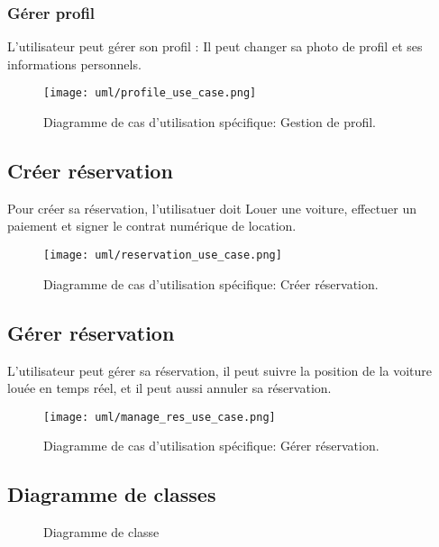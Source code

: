 \subsubsection{Gérer profil}
L'utilisateur peut gérer son profil : Il peut changer sa photo de profil et ses informations personnels.\\
\begin{figure}[H]
    \centering
    \texttt{[image: uml/profile\_use\_case.png]}
    \vspace{1cm}
    \captionsetup{justification=centering}
    \caption{Diagramme de cas d'utilisation spécifique: Gestion de profil.}
    \label{fig:use_case_manage_profile}
\end{figure}
\subsection{Créer réservation}
Pour créer sa réservation, l'utilisatuer doit Louer une voiture, effectuer un paiement et signer le contrat numérique de location.\\
\begin{figure}[H]
    \centering
    \texttt{[image: uml/reservation\_use\_case.png]}
    \vspace{1cm}
    \captionsetup{justification=centering}
    \caption{Diagramme de cas d'utilisation spécifique: Créer réservation.}
    \label{fig:use_case_create_res}
\end{figure}
\subsection{Gérer réservation}
L'utilisateur peut gérer sa réservation, il peut suivre la position de la voiture louée en temps réel, et il peut aussi annuler sa réservation.
\begin{figure}[H]
    \centering
    \texttt{[image: uml/manage\_res\_use\_case.png]}
    \vspace{1cm}
    \captionsetup{justification=centering}
    \caption{Diagramme de cas d'utilisation spécifique: Gérer réservation.}
    \label{fig:use_case_manage_res}
\end{figure}


\subsection{Diagramme de classes}
\begin{figure}[H]
    \centering
    \vspace{1cm}
    \captionsetup{justification=centering}

    \caption{Diagramme de classe}
    \label{fig:class_diag}
\end{figure}
\clearpage
